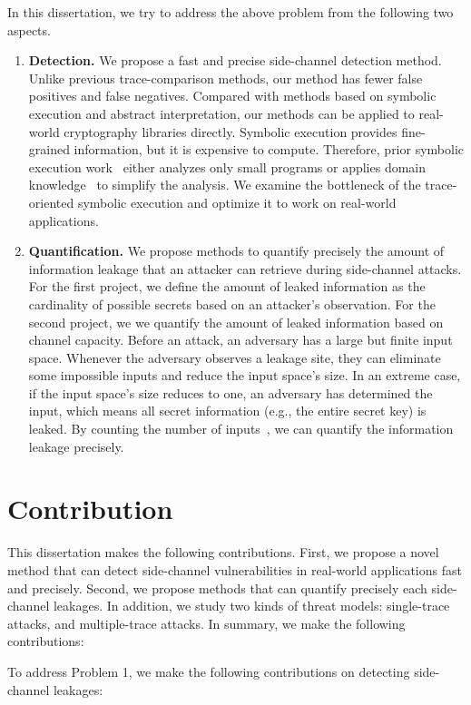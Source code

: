 In this dissertation, we try to address the above problem from the following two aspects.
\begin{enumerate}
    \item \textbf{Detection.} We propose a fast and precise side-channel detection method. Unlike previous trace-comparison methods, our method has fewer false positives and false negatives. Compared with methods based on symbolic execution and abstract interpretation, our methods can be applied to real-world cryptography libraries directly. Symbolic execution provides fine-grained information, but it is expensive to compute. Therefore, prior symbolic execution work~\cite{203878,236338,Brotzman19Casym} either analyzes only small programs or applies domain knowledge~\cite{203878} to simplify the analysis. We examine the bottleneck of the trace-oriented symbolic execution and optimize it to work on real-world applications.
    \item \textbf{Quantification.} We propose methods to quantify precisely the amount of information leakage that an attacker can retrieve during side-channel attacks. For the first project, we define the amount of leaked information as the cardinality of possible secrets based on an attacker's observation. For the second project, we we quantify the amount of leaked information based on channel capacity. Before an attack, an adversary has a large but finite input space. Whenever the adversary observes a leakage site, they can eliminate some impossible inputs and reduce the input space's size. In an extreme case, if the input space's size reduces to one, an adversary has determined the input, which means all secret information (e.g., the entire secret key) is leaked. By counting the number of inputs~\cite{10.1007/11499107_24}, we can quantify the information leakage precisely. 
\end{enumerate}


\section{Contribution}
This dissertation makes the following contributions. First, we propose a novel method that can detect side-channel vulnerabilities in real-world applications fast and precisely. Second, we propose methods that can quantify precisely each side-channel leakages. In addition, we study two kinds of threat models: single-trace attacks, and multiple-trace attacks. In summary, we make the following contributions:

To address Problem 1, we make the following contributions on detecting side-channel leakages:

